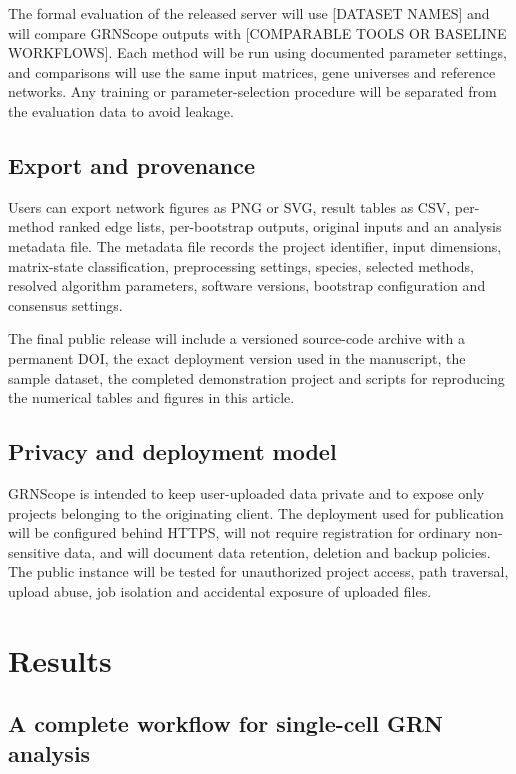 \documentclass[unnumsec,webpdf,modern,large]{oup-authoring-template}%
\begin{document}
The formal evaluation of the released server will use [DATASET NAMES] and will compare GRNScope outputs with [COMPARABLE TOOLS OR BASELINE WORKFLOWS]. Each method will be run using documented parameter settings, and comparisons will use the same input matrices, gene universes and reference networks. Any training or parameter-selection procedure will be separated from the evaluation data to avoid leakage.

\subsection{Export and provenance}

Users can export network figures as PNG or SVG, result tables as CSV, per-method ranked edge lists, per-bootstrap outputs, original inputs and an analysis metadata file. The metadata file records the project identifier, input dimensions, matrix-state classification, preprocessing settings, species, selected methods, resolved algorithm parameters, software versions, bootstrap configuration and consensus settings.

The final public release will include a versioned source-code archive with a permanent DOI, the exact deployment version used in the manuscript, the sample dataset, the completed demonstration project and scripts for reproducing the numerical tables and figures in this article.

\subsection{Privacy and deployment model}

GRNScope is intended to keep user-uploaded data private and to expose only projects belonging to the originating client. The deployment used for publication will be configured behind HTTPS, will not require registration for ordinary non-sensitive data, and will document data retention, deletion and backup policies. The public instance will be tested for unauthorized project access, path traversal, upload abuse, job isolation and accidental exposure of uploaded files.

\section{Results}

\subsection{A complete workflow for single-cell GRN analysis}
\end{document}
